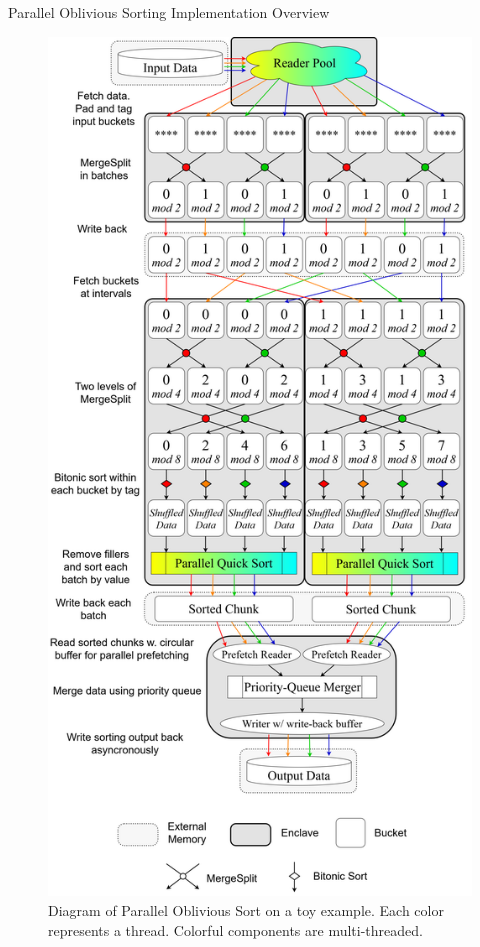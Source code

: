\documentclass[final,hyperref={pdfpagelabels=false}]{beamer}
\begin{document}
\begin{frame}
\begin{columns}[t]
  \begin{column}{.25\linewidth}
  \begin{block}{Parallel Oblivious Sorting Implementation Overview}
    \end{block}
    \begin{figure}
      \includegraphics[width=\linewidth]{assets/parosort.png}
      \caption{Diagram of Parallel Oblivious Sort on a toy example. Each color represents a thread. Colorful components are multi-threaded.}
    \end{figure}
  \end{column}


\end{columns}
\end{frame}
\end{document}
